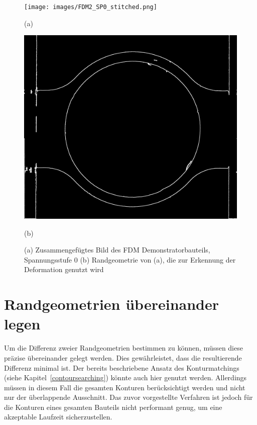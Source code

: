 \begin{figure}[H]
    \centering
    \begin{minipage}{0.49\textwidth}
        \centering
        \texttt{[image: images/FDM2\_SP0\_stitched.png]} %
        \caption*{(a)} 
    \end{minipage}\hfill
    \begin{minipage}{0.49\textwidth}
        \centering
        \includegraphics[width=\textwidth]{images/contours_FDM2_SP0_stitched.png} %
        \caption*{(b)}
    \end{minipage}\hfill
    \caption{(a) Zusammengefügtes Bild des FDM Demonstratorbauteils, Spannungsstufe 0
    (b) Randgeometrie von (a), die zur Erkennung der Deformation genutzt wird}
        \label{fig:stichted_contour}
\end{figure}

\section{Randgeometrien übereinander legen}

Um die Differenz zweier Randgeometrien bestimmen zu können, 
müssen diese präzise übereinander gelegt werden. Dies gewährleistet, 
dass die resultierende Differenz minimal ist. Der bereits beschriebene Ansatz 
des Konturmatchings (siehe Kapitel~\ref{contoursearching}) könnte auch hier genutzt werden. Allerdings 
müssen in diesem Fall die gesamten Konturen berücksichtigt werden und nicht 
nur der überlappende Ausschnitt. Das zuvor vorgestellte Verfahren ist jedoch 
für die Konturen eines gesamten Bauteils nicht performant genug, um eine 
akzeptable Laufzeit sicherzustellen.

